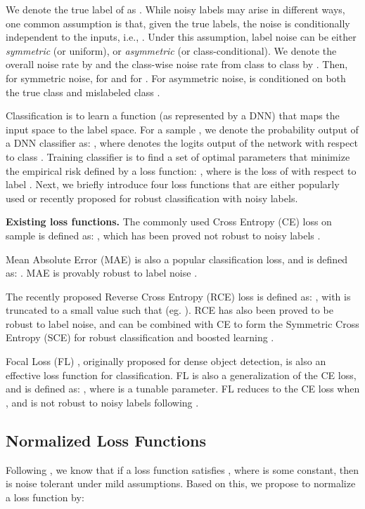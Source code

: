 \documentclass{article}
\begin{document}
We denote the true label of  as .
While noisy labels may arise in different ways, one common assumption is that, given the true labels, the noise is conditionally independent to the inputs, i.e., .
Under this assumption, label noise can be either \emph{symmetric} (or uniform), or \emph{asymmetric} (or class-conditional). We denote the overall noise rate by  and the class-wise noise rate from class  to class  by . Then, for symmetric noise,  for  and  for .  For asymmetric noise,  is conditioned on both the true class  and mislabeled class . 

Classification is to learn a function  (as represented by a DNN) that maps the input space to the label space.
For a sample , we denote the probability output of a DNN classifier  as: , where  denotes the logits output of the network with respect to class .
Training classifier  is to find a set of optimal parameters  that minimize the empirical risk defined by a loss function: , where  is the loss of  with respect to label .
Next, we briefly introduce four loss functions that are either popularly used or recently proposed for robust classification with noisy labels. 

\noindent\textbf{Existing loss functions.} 
The commonly used Cross Entropy (CE) loss on sample  is defined as: , which has been proved not robust to noisy labels \cite{ghosh2017robust}.

Mean Absolute Error (MAE) is also a popular classification loss, and is defined as: . 
MAE is provably robust to label noise \cite{ghosh2017robust}.

The recently proposed Reverse Cross Entropy (RCE) loss  \cite{wang2019symmetric} is defined as: ,
with  is truncated to a small value such that  (eg. ). RCE has also been proved to be robust to label noise, and can be combined with CE to form the Symmetric Cross Entropy (SCE) for robust classification and boosted learning \cite{wang2019symmetric}.

Focal Loss (FL) \cite{lin2017focal}, originally proposed for dense object detection, is also an effective loss function for classification. FL is also a generalization of the CE loss, and is defined as: ,
where  is a tunable parameter. FL reduces to the CE loss when , and is not robust to noisy labels following \cite{ghosh2017robust}.

\subsection{Normalized Loss Functions}\label{normalized_loss}
Following \cite{ghosh2017robust,charoenphakdee2019symmetric}, we know that if a loss function  satisfies ,
where  is some constant, then  is noise tolerant under mild assumptions.
Based on this, we propose to normalize a loss function by:
\end{document}
